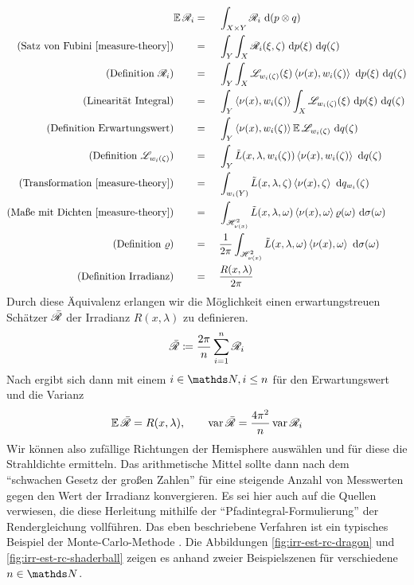 		\begin{alignat*}{3}
			\expect \e{R}_i &=&&\ \integral{X\times Y}{}{\e{R}_i}{(p\otimes q)} \\
			\text{(Satz von Fubini \cite[S.~175~f]{measure-theory})}\qquad &=&&\ \integral{Y}{}{ \integral{X}{}{ \e{R}_i(\xi,\zeta) }{p(\xi)} }{q(\zeta)} \\
			\text{(Definition $\e{R}_i$)}\qquad &=&&\ \integral{Y}{}{ \integral{X}{}{ \e{L}_{w_i(\zeta)}(\xi) \dotp{\nu(x)}{w_i(\zeta)} }{p(\xi)} }{q(\zeta)} \\
			\text{(Linearität Integral)}\qquad &=&&\ \integral{Y}{}{ \dotp{\nu(x)}{w_i(\zeta)} \integral{X}{}{ \e{L}_{w_i(\zeta)}(\xi)  }{p(\xi)} }{q(\zeta)} \\
			\text{(Definition Erwartungswert)}\qquad&=&&\ \integral{Y}{}{ \dotp{\nu(x)}{w_i(\zeta)}\expect \e{L}_{w_i(\zeta)} }{q(\zeta)} \\
			\text{(Definition $\e{L}_{w_i(\zeta)}$)}\qquad&=&&\ \integral{Y}{}{ \tilde{L}(x,\lambda,w_i(\zeta)) \dotp{\nu(x)}{w_i(\zeta)}}{q(\zeta)} \\
			\text{(Transformation \cite[S.~191~f]{measure-theory})}\qquad &=&&\ \integral{w_i(Y)}{}{ \tilde{L}(x,\lambda,\zeta) \dotp{\nu(x)}{\zeta}}{q_{w_i}(\zeta)} \\
			\text{(Maße mit Dichten \cite[S.~127~f]{measure-theory})}\qquad &=&&\ \integral{\shs{\nu(x)}}{}{\tilde{L}(x,\lambda,\omega)\dotp{\nu(x)}{\omega}\varrho(\omega)}{\sigma(\omega)} \\
			\text{(Definition $\varrho$)}\qquad&=&&\ \frac{1}{2\pi} \integral{\shs{\nu(x)}}{}{\tilde{L}(x,\lambda,\omega)\dotp{\nu(x)}{\omega}}{\sigma(\omega)} \\
			\text{(Definition Irradianz)}\qquad&=&&\ \frac{R(x,\lambda)}{2\pi}
		\end{alignat*}
		Durch diese Äquivalenz erlangen wir die Möglichkeit einen erwartungstreuen Schätzer $\bar{\mathscr{R}}$ der Irradianz $R(x,\lambda)$ zu definieren.
		\[
			\bar{\mathscr{R}} \coloneqq \frac{2\pi}{n}\sum_{i=1}^n \mathscr{R}_i
		\]
		Nach \cite[S.~249~ff]{prob-theory} ergibt sich dann mit einem $i\in\SN,i\leq n$ für den Erwartungswert und die Varianz
		\[
			\operatorname{\mathbb{E}} \bar{\mathscr{R}} = R(x,\lambda),\qquad \operatorname{var} \bar{\mathscr{R}} = \frac{4\pi^2}{n}\operatorname{var} \mathscr{R}_i
		\]
		Wir können also zufällige Richtungen der Hemisphere auswählen und für diese die Strahldichte ermitteln.
		Das arithmetische Mittel sollte dann nach dem \enquote{schwachen Gesetz der großen Zahlen} \cite[S.~254]{prob-theory} für eine steigende Anzahl von Messwerten gegen den Wert der Irradianz konvergieren.
		Es sei hier auch auf die Quellen \cite{kajiya-lte,pbrt3,veach-thesis} verwiesen, die diese Herleitung mithilfe der \enquote{Pfadintegral-Formulierung} der Rendergleichung vollführen.
		Das eben beschriebene Verfahren ist ein typisches Beispiel der Monte-Carlo-Methode \cite{monte-carlo-method}.
		Die Abbildungen \ref{fig:irr-est-rc-dragon} und \ref{fig:irr-est-rc-shaderball} zeigen es anhand zweier Beispielszenen für verschiedene $n\in\SN$.

